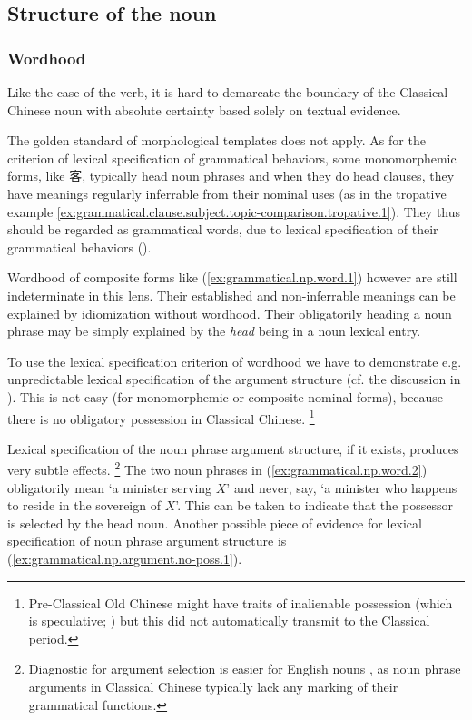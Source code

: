\documentclass[UTF8, a4paper, oneside, scheme=plain, 12pt]{ctexrep}
\newcommand*{\citepage}[1]{p.~{#1}}
\newcommand{\translate}[1]{`#1'}
\begin{document}
\subsection{Structure of the noun}\label{sec:grammatical.np.word}

\subsubsection{Wordhood}\label{sec:grammatical.np.word.wordhood}

Like the case of the verb, 
it is hard to demarcate the boundary of the Classical Chinese noun with absolute certainty
based solely on textual evidence. 

The golden standard of morphological templates does not apply. 
As for the criterion of lexical specification of grammatical behaviors,
some monomorphemic forms, like 客, typically head noun phrases and when they do head clauses,
they have meanings regularly inferrable from their nominal uses (as in the tropative example \ref{ex:grammatical.clause.subject.topic-comparison.tropative.1}).
They thus should be regarded as grammatical words, due to lexical specification of their grammatical behaviors
().

Wordhood of composite forms like (\ref{ex:grammatical.np.word.1}) however are still indeterminate in this lens.
Their established and non-inferrable meanings can be explained by idiomization without wordhood.
Their obligatorily heading a noun phrase may be simply explained by the \emph{head} being in a noun lexical entry.

To use the lexical specification criterion of wordhood we have to demonstrate e.g. unpredictable lexical specification of the argument structure (cf. the discussion in ).
This is not easy (for monomorphemic or composite nominal forms),
because there is no obligatory possession in Classical Chinese.%
\footnote{
    Pre-Classical Old Chinese might have traits of inalienable possession \citep[\citepage{57}]{baxter2014old} (which is speculative; \citealt[\citepage{141}]{hill2019historical}) but this did not automatically transmit to the Classical period.
}

Lexical specification of the noun phrase argument structure, if it exists, produces very subtle effects.%
\footnote{
    Diagnostic for argument selection is easier for English nouns \citep[\citepage{440}]{cgel},
    as noun phrase arguments in Classical Chinese typically lack any marking of their grammatical functions.
}
The two noun phrases in (\ref{ex:grammatical.np.word.2}) obligatorily mean \translate{a minister serving $X$} and never, say, \translate{a minister who happens to reside in the sovereign of $X$}.
This can be taken to indicate that the possessor is selected by the head noun.
Another possible piece of evidence for lexical specification of noun phrase argument structure is (\ref{ex:grammatical.np.argument.no-poss.1}).
\end{document}
